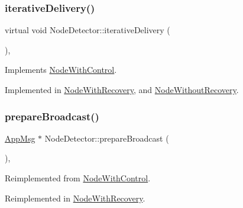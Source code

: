 \subsubsection{\texorpdfstring{iterative\+Delivery()}{iterativeDelivery()}}
{\footnotesize\ttfamily virtual void Node\+Detector\+::iterative\+Delivery (\begin{DoxyParamCaption}{ }\end{DoxyParamCaption})\hspace{0.3cm}{\ttfamily [protected]}, {}}



Implements \hyperlink{classNodeWithControl_a4f78078272b90937e0746c797443b37d}{Node\+With\+Control}.



Implemented in \hyperlink{classNodeWithRecovery_a9b61912f38b62452584dc80bf261ef4e}{Node\+With\+Recovery}, and \hyperlink{classNodeWithoutRecovery_a65e21db6d6b4e72b898fd567f8b4aee2}{Node\+Without\+Recovery}.

\mbox{\label{classNodeDetector_af75cf37cc01fc51bc228a7a83c10cb97}} 
\subsubsection{\texorpdfstring{prepare\+Broadcast()}{prepareBroadcast()}}
{\footnotesize\ttfamily \hyperlink{classAppMsg}{App\+Msg} $\ast$ Node\+Detector\+::prepare\+Broadcast (\begin{DoxyParamCaption}{ }\end{DoxyParamCaption})\hspace{0.3cm}{\ttfamily [protected]}, {\ttfamily [virtual]}}



Reimplemented from \hyperlink{classNodeWithControl_ab871014cf3f42d834f8d34ad5498174c}{Node\+With\+Control}.



Reimplemented in \hyperlink{classNodeWithRecovery_a33d8e8775fd69cb647b38a54b36e1ebe}{Node\+With\+Recovery}.

\mbox{\label{classNodeDetector_ab69432c6d3327a684845ec231826727e}} 

